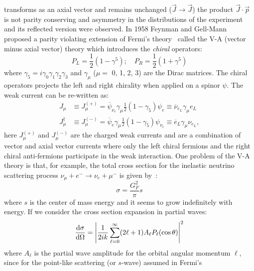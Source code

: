 transforms as an axial vector and remains unchanged ($\vec{J} \to \vec{J}$) the
product $\vec{J} \cdot \vec{p}$ is not parity conserving and asymmetry in the
distributions of the experiment and its reflected version were observed. In 1958
Feynman and Gell-Mann proposed a parity violating extension of Fermi's
theory~\cite{VATheory} called the V-A (vector minus axial vector) theory which
introduces the \emph{chiral} operators:
\begin{equation}
  \label{eq:152}
  P_L = \frac{1}{2}(1 - \gamma^5); \quad P_R = \frac{1}{2}(1 + \gamma^5)
\end{equation}
where $\gamma_5 = i \gamma_0 \gamma_1 \gamma_2 \gamma_3$ and $\gamma_\mu$
($\mu =$ 0, 1, 2, 3) are the Dirac matrices. The chiral operators projects the
left and right chirality when applied on a spinor $\psi$. The weak current can
be re-written as:
\begin{equation}
  \begin{split}
    J_\mu & \equiv J_\mu^{(+)} = \overbar{\psi}_{\nu_e} \gamma_\mu \frac{1}{2}
    \left(1 - \gamma_5 \right) \psi_e \equiv \overbar{\nu}_{e_L}
    \gamma_\mu e_L \\
    J_\mu^\dagger & \equiv J_\mu^{(-)} = \overbar{\psi}_e \gamma_\mu \frac{1}{2}
    (1 - \gamma_5) \psi_{\nu_e} \equiv \overbar{e}_L \gamma_\mu \nu_{e_L},
  \end{split}
  \label{eq:153}
\end{equation}
here $J_\mu^{(+)}$ and $J_\mu^{(-)}$ are the charged weak currents and are a
combination of vector and axial vector currents where only the left chiral
fermions and the right chiral anti-fermions participate in the weak
interaction. One problem of the V-A theory is that, for example, the total cross
section for the inelastic neutrino scattering process
$\nu_\mu + e^- \rightarrow \nu_e + \mu^-$ is given
by~\cite{VAUnitaryViolationBook}:
\begin{equation}
  \label{eq:155}
  \sigma = \frac{G_F^2}{\pi}s
\end{equation}
where $s$ is the center of mass energy and it seems to grow indefinitely with
energy. If we consider the cross section expansion in partial waves:
\begin{equation}
  \label{eq:156}
  \frac{\mathrm{d} \sigma}{\mathrm{d} \Omega} = \left| \frac{1}{2ik} \sum_{\ell = 0}^\infty
    (2 \ell + 1) A_\ell P_\ell(\cos \theta) \right|^2
\end{equation}
where $A_\ell$ is the partial wave amplitude for the orbital angular momentum
$\ell$, since for the point-like scattering (or $s$-wave) assumed in Fermi's
